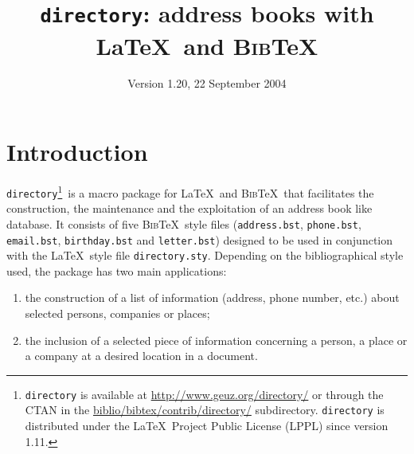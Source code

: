 \documentclass[10pt]{article}
\newcommand{\BibTeX}{\textsc{Bib}\TeX}
\newcommand{\Download}{\footnote{\texttt{directory} is available at
\url{http://www.geuz.org/directory/} or through the CTAN in the
\url{biblio/bibtex/contrib/directory/} subdirectory. \texttt{directory}
is distributed under the \LaTeX\ Project Public License (LPPL) since
version 1.11.}}
\begin{document}
\title{\texttt{directory}: address books with \LaTeX\ and \BibTeX}

\author{}


\date{Version 1.20, 22 September 2004}

\maketitle


\tableofcontents

\section{Introduction}

\texttt{directory}\Download\ is a macro package for \LaTeX\ and \BibTeX\ that
facilitates the construction, the maintenance and the exploitation of an
address book like database. It consists of five \BibTeX\ style files
(\texttt{address.bst}, \texttt{phone.bst}, \texttt{email.bst},
\texttt{birthday.bst} and \texttt{letter.bst}) designed to be used in
conjunction with the \LaTeX\ style file \texttt{directory.sty}. Depending on
the bibliographical style used, the package has two main applications:

\begin{enumerate}
\item
the construction of a list of information (address, phone number, etc.)
about selected persons, companies or places;
\item
the inclusion of a selected piece of information concerning a person, a
place or a company at a desired location in a document.
\end{enumerate}
\end{document}
